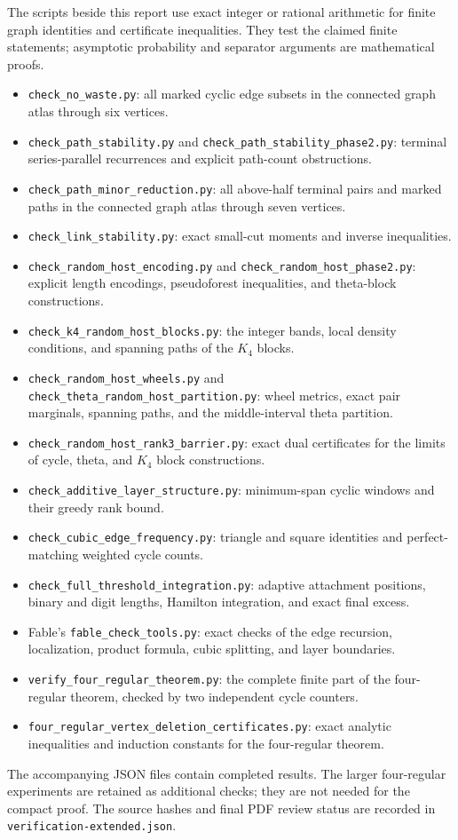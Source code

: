 \documentclass[11pt]{article}
\begin{document}
The scripts beside this report use exact integer or rational arithmetic for finite graph identities and certificate inequalities.
They test the claimed finite statements; asymptotic probability and separator arguments are mathematical proofs.
\begin{itemize}
\item \nolinkurl{check_no_waste.py}: all marked cyclic edge subsets in the connected graph atlas through six vertices.
\item \nolinkurl{check_path_stability.py} and \nolinkurl{check_path_stability_phase2.py}: terminal series-parallel recurrences and explicit path-count obstructions.
\item \nolinkurl{check_path_minor_reduction.py}: all above-half terminal pairs and marked paths in the connected graph atlas through seven vertices.
\item \nolinkurl{check_link_stability.py}: exact small-cut moments and inverse inequalities.
\item \nolinkurl{check_random_host_encoding.py} and \nolinkurl{check_random_host_phase2.py}: explicit length encodings, pseudoforest inequalities, and theta-block constructions.
\item \nolinkurl{check_k4_random_host_blocks.py}: the integer bands, local density conditions, and spanning paths of the $K_4$ blocks.
\item \nolinkurl{check_random_host_wheels.py} and \nolinkurl{check_theta_random_host_partition.py}: wheel metrics, exact pair marginals, spanning paths, and the middle-interval theta partition.
\item \nolinkurl{check_random_host_rank3_barrier.py}: exact dual certificates for the limits of cycle, theta, and $K_4$ block constructions.
\item \nolinkurl{check_additive_layer_structure.py}: minimum-span cyclic windows and their greedy rank bound.
\item \nolinkurl{check_cubic_edge_frequency.py}: triangle and square identities and perfect-matching weighted cycle counts.
\item \nolinkurl{check_full_threshold_integration.py}: adaptive attachment positions, binary and digit lengths, Hamilton integration, and exact final excess.
\item Fable's \nolinkurl{fable_check_tools.py}: exact checks of the edge recursion, localization, product formula, cubic splitting, and layer boundaries.
\item \nolinkurl{verify_four_regular_theorem.py}: the complete finite part of the four-regular theorem, checked by two independent cycle counters.
\item \nolinkurl{four_regular_vertex_deletion_certificates.py}: exact analytic inequalities and induction constants for the four-regular theorem.
\end{itemize}

The accompanying JSON files contain completed results.
The larger four-regular experiments are retained as additional checks; they are not needed for the compact proof.
The source hashes and final PDF review status are recorded in \nolinkurl{verification-extended.json}.
\end{document}
